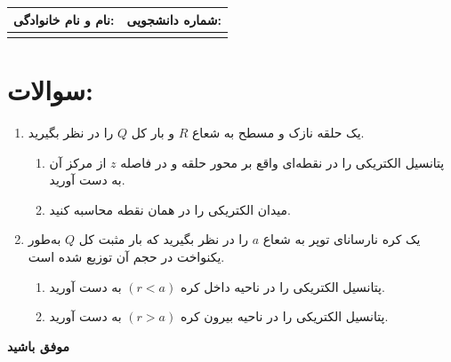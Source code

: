 \documentclass[12pt,a4paper]{article}
\begin{document}
	
	\begin{center}
		\begin{tabular}{|p{7cm}|p{7cm}|}
			\hline
			\textbf{نام و نام خانوادگی:} & \textbf{شماره دانشجویی:} \\
			\hline
			\vspace{0.5cm} & \vspace{0.5cm} \\
			\hline
		\end{tabular}
	\end{center}
	
	\vspace{10pt}
	
	\section*{سوالات:}
	
	\begin{enumerate}
		
		\item
		یک حلقه نازک و مسطح به شعاع $R$ و بار کل $Q$ را در نظر بگیرید.
		\begin{enumerate}
			\item[(الف)] پتانسیل الکتریکی را در نقطه‌ای واقع بر محور حلقه و در فاصله $z$ از مرکز آن به دست آورید.
			\item[(ب)] میدان الکتریکی را در همان نقطه محاسبه کنید.
		\end{enumerate}
		
		\vspace{6pt}
		
		\item
		یک کره نارسانای توپر به شعاع $a$ را در نظر بگیرید که بار مثبت کل $Q$
		به‌طور یکنواخت در حجم آن توزیع شده است.
		\begin{enumerate}
			\item[(الف)] پتانسیل الکتریکی را در ناحیه داخل کره $(r<a)$ به دست آورید.
			\item[(ب)] پتانسیل الکتریکی را در ناحیه بیرون کره $(r>a)$ به دست آورید.
		\end{enumerate}
		
	\end{enumerate}
	
	\vspace{12pt}
	\begin{center}
		\textbf{موفق باشید }
	\end{center}
	
\end{document}

